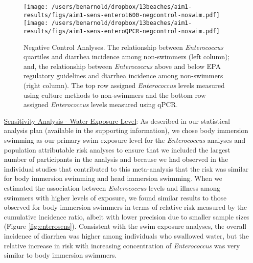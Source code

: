 \documentclass[12pt]{article}\usepackage[]{graphicx}\usepackage[]{color}
\begin{document}
\begin{figure}[h!tb]
\begin{center}
\texttt{[image: /users/benarnold/dropbox/13beaches/aim1-results/figs/aim1-sens-entero1600-negcontrol-noswim.pdf]} \\
\texttt{[image: /users/benarnold/dropbox/13beaches/aim1-results/figs/aim1-sens-enteroQPCR-negcontrol-noswim.pdf]}
\begin{minipage}{0.9\textwidth}
\caption{Negative Control Analyses. The relationship between \emph{Enterococcus}  quartiles and diarrhea incidence among non-swimmers (left column); and, the relationship between \emph{Enterococcus} above and below EPA regulatory guidelines and diarrhea incidence among non-swimmers (right column). The top row assigned \textit{Enterococcus} levels measured using culture methods to non-swimmers and the bottom row assigned \textit{Enterococcus} levels measured using qPCR. \label{fig:negcontrols}}
\end{minipage}
\end{center}
\end{figure}

\clearpage
\underline{Sensitivity Analysis - Water Exposure Level}: As described in our statistical analysis plan (available in the supporting information), we chose body immersion swimming as our primary swim exposure level for the \emph{Enterococcus} analyses and population attributable risk analyses to ensure that we included the largest number of participants in the analysis and because we had observed in the individual studies that contributed to this meta-analysis that the risk was similar for body immersion swimming and head immersion swimming. When we estimated the association between \emph{Enterococcus} levels and illness among swimmers with higher levels of exposure, we found similar results to those observed for body immersion swimmers in terms of relative risk measured by the cumulative incidence ratio, albeit with lower precision due to smaller sample sizes (Figure \ref{fig:enterosens}). Consistent with the swim exposure analyses, the overall incidence of diarrhea was higher among individuals who swallowed water, but the relative increase in risk with increasing concentration of \emph{Enterococcus} was very similar to body immersion swimmers.
\end{document}
